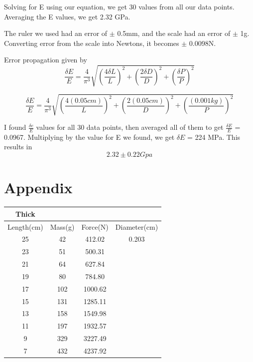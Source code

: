 \documentclass{article}
\begin{document}
Solving for E using our equation, we get 30 values from all our data points. Averaging the E values, we get 2.32 GPa.

The ruler we used had an error of $\pm$ 0.5mm, and the scale had an error of $\pm$ 1g. Converting error from the scale into Newtons, it becomes $\pm$ 0.0098N.

Error propagation given by
$$\frac{\delta E}{E} = \frac{4}{\pi ^3}\sqrt{(\frac{4\delta L}{L})^2 + (\frac{2\delta D}{D})^2 + (\frac{\delta P}{P})^2}$$

$$\frac{\delta E}{E} = \frac{4}{\pi ^3}\sqrt{(\frac{4(0.05cm)}{L})^2 + (\frac{2(0.05cm)}{D})^2 + (\frac{(0.001kg)}{P})^2}$$

I found $\frac{\delta e}{E}$ values for all 30 data points, then averaged all of them to get $\frac{\delta E}{E}$ = 0.0967. Multiplying by the value for E we found, we get $\delta E$ = 224 MPa. This results in $$2.32 \pm 0.22 Gpa$$

\section{Appendix}
\centering
\begin{tabular}{|| c | c | c | c ||}
 \hline
 Thick &\ &\ &\ \\
 \hline
 Length(cm) & Mass(g) & Force(N) & Diameter(cm) \\
 \hline
 \hline
 25 & 42 & 412.02 & 0.203 \\
 23 & 51 & 500.31 &\ \\
 21 & 64 & 627.84 &\ \\
 19 & 80 & 784.80 &\ \\
 17 & 102 & 1000.62 &\ \\
 15 & 131 & 1285.11 &\ \\
 13 & 158 & 1549.98 &\ \\
 11 & 197 & 1932.57 &\ \\
 9 & 329 & 3227.49 &\ \\
 7 & 432 & 4237.92 &\ \\
 \hline
\end{tabular}\\\ \\\ \\\ 
\end{document}
